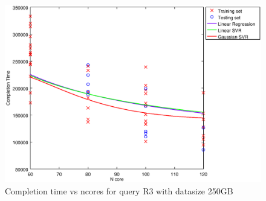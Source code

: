 
\begin {figure}[hbtp]
\centering
\includegraphics[width=\textwidth]{output/R3_250_1_OVER_NCORES/plot_R3_250_bestmodels.eps}
\caption{Completion time vs ncores for query R3 with datasize 250GB}
\label{fig:all_nonlinear_R3_250}
\end {figure}
